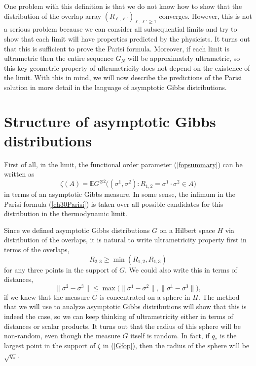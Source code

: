 \documentclass[12pt]{article}
\newcommand{\e}{\mathbb{E}}
\theoremstyle{nonumberplain}
\begin{document}
One problem with this definition is that we do not know how to show that the distribution of the overlap array $(R_{\ell,\ell'})_{\ell,\ell'\geq 1}$ converges. However, this is not a serious problem because we can consider all subsequential limits and try to show that each limit will have properties predicted by the physicists. It turns out that this is sufficient to prove the Parisi formula. Moreover, if each limit is ultrametric then the entire sequence $G_N$ will be approximately ultrametric, so this key geometric property of ultrametricity does not depend on the existence of the limit. With this in mind, we will now describe the predictions of the Parisi solution in more detail in the language of asymptotic Gibbs distributions.  





\section{Structure of asymptotic Gibbs distributions} 

First of all, in the limit, the functional order parameter (\ref{fopsummary}) can be written as
\begin{equation}
\zeta(A) = \e G^{\otimes 2}\bigl((\sigma^1,\sigma^2) : R_{1,2} = \sigma^1\cdot \sigma^2 \in A\bigr)
\label{Gfop}
\end{equation}
in terms of an asymptotic Gibbs measure. In some sense, the infimum in the Parisi formula (\ref{ch30Parisi}) is taken over all possible candidates for this distribution in the thermodynamic limit. 

Since we defined asymptotic Gibbs distributions $G$ on a Hilbert space $H$ via distribution of the overlaps, it is natural to write ultrametricity property first in terms of the overlaps,
\begin{equation}
R_{2,3} \geq \min(R_{1,2}, R_{1,3})
\label{ultra2}
\end{equation}
for any three points in the support of $G$. We could also write this in terms of distances,
\begin{equation}
\|{\sigma}^2 - {\sigma}^3\|
\leq
\max\bigl(\|{\sigma}^1 - {\sigma}^2\|,
\|{\sigma}^1 -{\sigma}^3\|\bigr),
\label{ultra1}
\end{equation}
if we knew that the measure $G$ is concentrated on a sphere in $H$. The method that we will use to analyze asymptotic Gibbs distributions will show that this is indeed the case, so we can keep thinking of ultrametricity either in terms of distances or scalar products. It turns out that the radius of this sphere will be non-random, even though the measure $G$ itself is random. In fact, if $q_*$ is the largest point in the support of $\zeta$ in (\ref{Gfop}), then the radius of the sphere will be $\sqrt{q_*}$.
\end{document}
